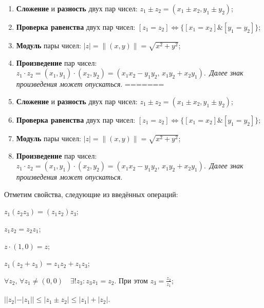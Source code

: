 \begin{enumerate}
<<<<<<< HEAD
\item\label{1:add_sub_pair_num} \textbf{Сложение} и \textbf{разность} двух пар чисел: \(z_1 \pm z_2 
    = (x_1 \pm x_2, y_1 \pm y_2)\);
\item\label{1:criterion_equality} \textbf{Проверка равенства} двух пар чисел: \(\left[z_1 = 
    z_2\right] \iff \{\left[x_1 = x_2\right] \& \left[y_1 = y_2\right]\}\);
\item\label{1:abs_pair_num} \textbf{Модуль} пары чисел: \(|z| = \left\|(x, y)\right\| = \sqrt{x^2 + 
    y^2}\);
\item\label{1:mult_pair_num} \textbf{Произведение} пар чисел: \(z_1 \cdot z_2 = (x_1, y_1) \cdot 
    (x_2, y_2) = (x_1 x_2 - y_1 y_2, \, x_1 y_2 + x_2 y_1)\).\ \textit{Далее знак произведения может
    опускаться}.
=======
\item \textbf{Сложение} и \textbf{разность} двух пар чисел: \(z_1 \pm z_2 = (x_1 \pm x_2, y_1 \pm 
    y_2)\);
\item\label{1:criterion_equality} \textbf{Проверка равенства} двух пар чисел: \(\left[z_1 = 
    z_2\right] \iff \{\left[x_1 = x_2\right] \& \left[y_1 = y_2\right]\}\);
\item\label{1:abs_pair_num} \textbf{Модуль} пары чисел: \(|z| = \left\|(x, y)\right\| = \sqrt{x^2 + 
    y^2}\);
\item\label{1:mult_pair_num} \textbf{Произведение} пар чисел: \(z_1 \cdot z_2 = (x_1, y_1) \cdot 
    (x_2, y_2) = (x_1 x_2 - y_1 y_2, \, x_1 y_2 + x_2 y_1)\).\ \textit{Далее знак произведения может
    опускаться}.
\end{enumerate}

Отметим свойства, следующие из введённых операций:

\begin{properties}
\item \(z_1 (z_2 z_3) = (z_1 z_2) z_3\);
\item \(z_1 z_2 = z_2 z_1\);
\item \(z \cdot (1, 0) = z\);
\item \(z_1 (z_2 + z_3) = z_1 z_2 + z_1 z_3\);
\item \(\forall z_2, \, \forall z_1 \neq (0, 0) \quad \exists! z_3 \colon z_3 z_1 = z_2\). При этом 
    \(z_3 = \frac{z_2}{z_1}\);
\item $||z_2| - |z_1|| \le |z_1 \pm z_2| \le |z_1| + |z_2|$.
\end{properties}

